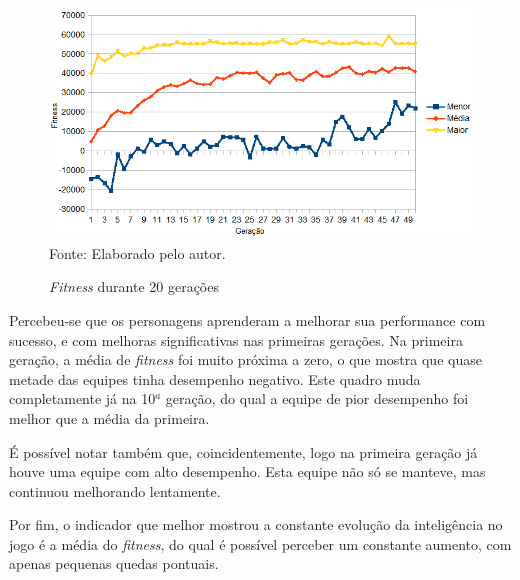 \documentclass[12pt,a4paper]{article}
\newcommand{\source}[1]{\small Fonte: {#1}}
\begin{document}
	\begin{figure}[ht!]
		\centering
		\caption{\textit{Fitness} durante 20 gerações}
		\includegraphics[scale=0.7]{AI-Result.png}\\
		\vspace{0.5mm}
		\source{Elaborado pelo autor.}
		\label{fig:fitnessResults}
	\end{figure}
	
	Percebeu-se que os personagens aprenderam a melhorar sua performance com sucesso,
	e com melhoras significativas nas primeiras gerações.
	Na primeira geração, a média de \textit{fitness} foi muito próxima a zero,
	o que mostra que quase metade das equipes tinha desempenho negativo.
	Este quadro muda completamente já na 10$^a$ geração,
	do qual a equipe de pior desempenho foi melhor que a média da primeira.
	
	É possível notar também que, coincidentemente,
	logo na primeira geração já houve uma equipe com alto desempenho.
	Esta equipe não só se manteve,
	 mas continuou melhorando lentamente.
	
	Por fim, o indicador que melhor mostrou a constante evolução da inteligência no jogo é a média do \textit{fitness},
	do qual é possível perceber um constante aumento,
	com apenas pequenas quedas pontuais.
	

\FloatBarrier
\newpage %
\end{document}

